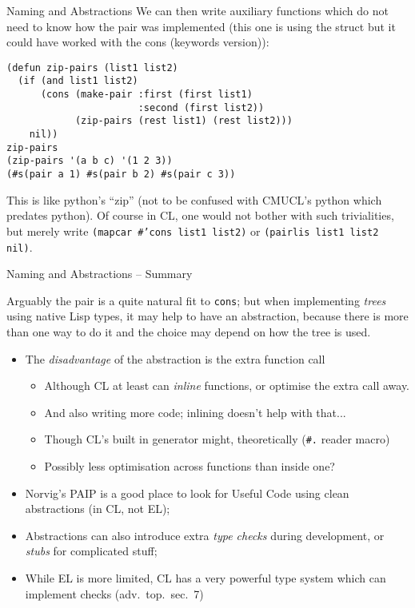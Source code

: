 \documentclass[presentation]{beamer}
\begin{document}
\begin{frame}[fragile]{Naming and Abstractions}
We can then write auxiliary functions which do not need to know how the pair was implemented (this one is using the struct but it could have worked with the cons (keywords version)):
\begin{verbatim}
(defun zip-pairs (list1 list2)
  (if (and list1 list2)
      (cons (make-pair :first (first list1)
                       :second (first list2))
            (zip-pairs (rest list1) (rest list2)))
    nil))
zip-pairs
(zip-pairs '(a b c) '(1 2 3))
(#s(pair a 1) #s(pair b 2) #s(pair c 3))
\end{verbatim}
This is like python's ``zip'' (not to be confused with CMUCL's python which predates python).  Of course in CL, one would not bother with such trivialities, but merely write \texttt{(mapcar \#'cons list1 list2)} or \texttt{(pairlis list1 list2 nil)}.
\end{frame}
\begin{frame}[fragile]{Naming and Abstractions -- Summary}

Arguably the pair is a quite natural fit to \texttt{cons}; but when implementing \emph{trees} using native Lisp types, it may help to have an abstraction, because there is more than one way to do it and the choice may depend on how the tree is used.
  
\begin{itemize}

\item The \emph{disadvantage} of the abstraction is the extra function call
  \begin{itemize}
  \item Although CL at least can \emph{inline} functions, or optimise the extra call away.
  \item And also writing more code; inlining doesn't help with that...
  \item Though CL's built in generator might, theoretically (\texttt{\#.} reader macro)
  \item Possibly less optimisation across functions than inside one?
  \end{itemize}
\item Norvig's PAIP is a good place to look for Useful Code using clean abstractions (in CL, not EL);
\item Abstractions can also introduce extra \emph{type checks} during development, or \emph{stubs} for complicated stuff;
\item While EL is more limited, CL has a very powerful type system which can implement checks (adv.\ top.\ sec.~7)
\end{itemize}

\end{frame}
\end{document}
